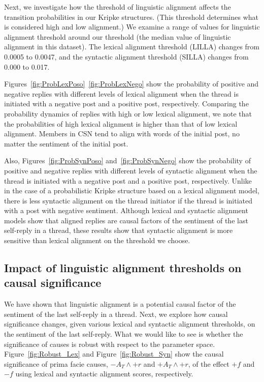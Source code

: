 Next, we investigate how the threshold of linguistic alignment affects the transition probabilities in our  Kripke structures.  (This threshold determines what is considered high and low alignment.) We examine a range of values for linguistic alignment threshold around our threshold (the median value of linguistic alignment in this dataset). The lexical alignment threshold (LILLA) changes from 0.0005 to 0.0047, and the syntactic alignment threshold (SILLA) changes from 0.000 to 0.017.  


Figures~\ref{fig:ProbLexPoso}~\ref{fig:ProbLexNego} show the probability of positive and negative replies with different levels of lexical alignment when the thread is initiated with a negative post and a positive post, respectively. Comparing the probability dynamics of replies with high or low lexical alignment, we note that the probabilities of high lexical alignment is higher than that of low lexical alignment. Members in CSN tend to align with words of the initial post, no matter the sentiment of the initial post.

Also, Figures~\ref{fig:ProbSynPoso} and~\ref{fig:ProbSynNego} show the probability of positive and negative replies with different levels of syntactic alignment when the thread is initiated with a negative post and a positive post, respectively. Unlike in the case of a probabilistic Kripke structure based on a lexical alignment model, there is less syntactic alignment on the thread initiator if the thread is initiated with a post with negative sentiment. Although lexical and syntactic alignment models show that aligned replies are causal factors of the sentiment of the last self-reply in a thread, these results show that syntactic alignment is more sensitive than lexical alignment on the threshold we choose.




\subsection{Impact of linguistic alignment thresholds on causal significance}

We have shown that linguistic alignment is a potential causal factor of the sentiment of the last self-reply in a thread. Next, we explore how causal significance changes, given various lexical and syntactic alignment thresholds, on the sentiment of the last self-reply. What we would like to see is whether the significance of causes is robust with respect to the parameter space.  Figure~\ref{fig:Robust_Lex} and Figure~\ref{fig:Robust_Syn} show the causal significance of prima facie causes, $-A_T \wedge +r$ and $+A_T \wedge +r$, of the effect $+f$ and $-f$ using lexical and syntactic alignment scores, respectively.

